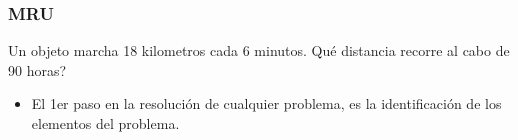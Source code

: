 \documentclass{beamer}
\begin{document}
\begin{frame}
\frametitle{MRU}
% 
Un {{ objeto }} marcha 18 kilometros cada 6 minutos. 
\¿Qu\'e {{ distancia }} recorre al cabo de {{ 90 horas? }} %

\begin{itemize}
\item El 1er paso en la resoluci\'on de cualquier problema, es la
identificaci\'on de los elementos del problema.
\end{itemize}



\end{frame}
\end{document}
